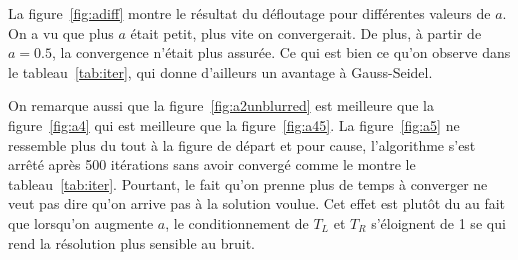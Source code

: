 La figure~\ref{fig:adiff} montre le résultat du défloutage pour différentes valeurs de $a$.
On a vu que plus $a$ était petit, plus vite on convergerait. De plus, à partir de $a = 0.5$, la convergence n'était plus assurée.
Ce qui est bien ce qu'on observe dans le tableau~\ref{tab:iter}, qui donne d'ailleurs un avantage
à Gauss-Seidel. 

On remarque aussi que
la figure~\ref{fig:a2unblurred} est meilleure que la figure~\ref{fig:a4} qui est meilleure
que la figure~\ref{fig:a45}.
La figure~\ref{fig:a5} ne ressemble plus du tout à la figure de départ et pour cause,
l'algorithme s'est arrêté après 500 itérations sans avoir convergé comme le montre
le tableau~\ref{tab:iter}.
Pourtant, le fait qu'on prenne plus de temps à converger ne veut pas dire qu'on arrive
pas à la solution voulue.
Cet effet est plutôt du au fait que lorsqu'on augmente $a$, le conditionnement de $T_L$
et $T_R$ s'éloignent de 1 se qui rend la résolution plus sensible au bruit.

